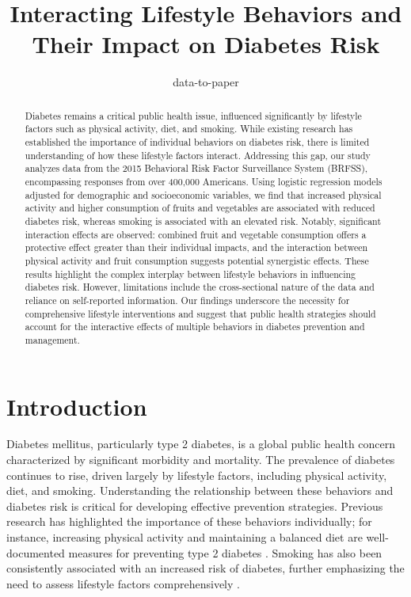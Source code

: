 \documentclass[11pt]{article}
\title{Interacting Lifestyle Behaviors and Their Impact on Diabetes Risk}
\author{data-to-paper}
\begin{document}
\maketitle
\begin{abstract}
Diabetes remains a critical public health issue, influenced significantly by lifestyle factors such as physical activity, diet, and smoking. While existing research has established the importance of individual behaviors on diabetes risk, there is limited understanding of how these lifestyle factors interact. Addressing this gap, our study analyzes data from the 2015 Behavioral Risk Factor Surveillance System (BRFSS), encompassing responses from over 400,000 Americans. Using logistic regression models adjusted for demographic and socioeconomic variables, we find that increased physical activity and higher consumption of fruits and vegetables are associated with reduced diabetes risk, whereas smoking is associated with an elevated risk. Notably, significant interaction effects are observed: combined fruit and vegetable consumption offers a protective effect greater than their individual impacts, and the interaction between physical activity and fruit consumption suggests potential synergistic effects. These results highlight the complex interplay between lifestyle behaviors in influencing diabetes risk. However, limitations include the cross-sectional nature of the data and reliance on self-reported information. Our findings underscore the necessity for comprehensive lifestyle interventions and suggest that public health strategies should account for the interactive effects of multiple behaviors in diabetes prevention and management.
\end{abstract}
\section*{Introduction}

Diabetes mellitus, particularly type 2 diabetes, is a global public health concern characterized by significant morbidity and mortality. The prevalence of diabetes continues to rise, driven largely by lifestyle factors, including physical activity, diet, and smoking. Understanding the relationship between these behaviors and diabetes risk is critical for developing effective prevention strategies. Previous research has highlighted the importance of these behaviors individually; for instance, increasing physical activity and maintaining a balanced diet are well-documented measures for preventing type 2 diabetes \cite{Astrup2001HealthyLI}. Smoking has also been consistently associated with an increased risk of diabetes, further emphasizing the need to assess lifestyle factors comprehensively \cite{Shi2013PhysicalAS}.
\end{document}
